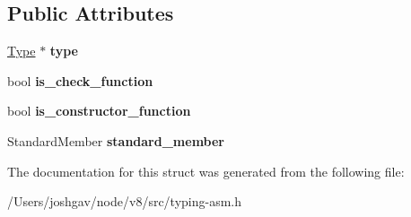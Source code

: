 \subsection*{Public Attributes}
\begin{DoxyCompactItemize}
\item 
\hyperlink{classv8_1_1internal_1_1_type}{Type} $\ast$ {\bfseries type}\hypertarget{structv8_1_1internal_1_1_asm_typer_1_1_variable_info_a37948b307bfad732ee8dd60263a7f74f}{}\label{structv8_1_1internal_1_1_asm_typer_1_1_variable_info_a37948b307bfad732ee8dd60263a7f74f}

\item 
bool {\bfseries is\+\_\+check\+\_\+function}\hypertarget{structv8_1_1internal_1_1_asm_typer_1_1_variable_info_a763da274a5529557dc5cd184f19dd223}{}\label{structv8_1_1internal_1_1_asm_typer_1_1_variable_info_a763da274a5529557dc5cd184f19dd223}

\item 
bool {\bfseries is\+\_\+constructor\+\_\+function}\hypertarget{structv8_1_1internal_1_1_asm_typer_1_1_variable_info_a54789a5175cf6e503c6033f2b38e6139}{}\label{structv8_1_1internal_1_1_asm_typer_1_1_variable_info_a54789a5175cf6e503c6033f2b38e6139}

\item 
Standard\+Member {\bfseries standard\+\_\+member}\hypertarget{structv8_1_1internal_1_1_asm_typer_1_1_variable_info_a5a397b8443ec11dd4494db5b875d20b7}{}\label{structv8_1_1internal_1_1_asm_typer_1_1_variable_info_a5a397b8443ec11dd4494db5b875d20b7}

\end{DoxyCompactItemize}


The documentation for this struct was generated from the following file\+:\begin{DoxyCompactItemize}
\item 
/\+Users/joshgav/node/v8/src/typing-\/asm.\+h\end{DoxyCompactItemize}
